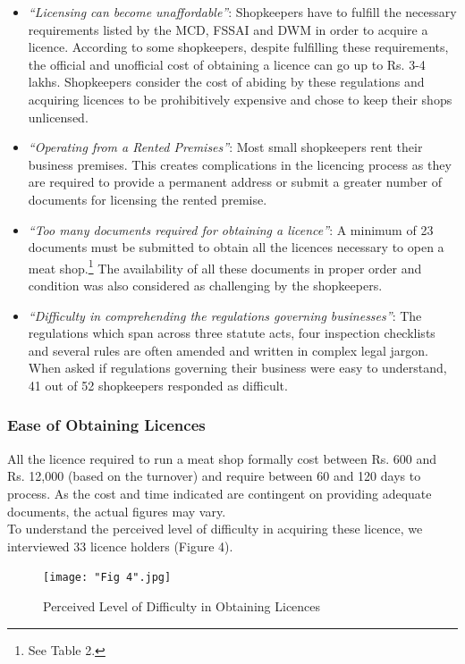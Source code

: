 \documentclass[a4paper, 12pt, twoside]{article}
\begin{document}
\begin{itemize}
\item \textit{“Licensing can become unaffordable”}: Shopkeepers have to fulfill the necessary requirements listed by the MCD, FSSAI and DWM in order to acquire a licence. According to some shopkeepers, despite fulfilling these requirements, the official and unofficial cost of obtaining a licence can go up to Rs. 3-4 lakhs. Shopkeepers consider the cost of abiding by these regulations and acquiring licences to be prohibitively expensive and chose to keep their shops unlicensed.
\item \textit{“Operating from a Rented Premises”}: Most small shopkeepers rent their business premises. This creates complications in the licencing process as they are required to provide a permanent address or submit a greater number of documents for licensing the rented premise. 
\item \textit{“Too many documents required for obtaining a licence”}: A minimum of 23 documents must be submitted to obtain all the licences necessary to open a meat shop.\footnote{ See Table 2.} The availability of all these documents in proper order and condition was also considered as challenging by the shopkeepers.
\item \textit{“Difficulty in comprehending the regulations governing businesses”}: The regulations which span across three statute acts, four inspection checklists and several rules are often amended and written in complex legal jargon. When asked if regulations governing their business were easy to understand, 41 out of 52 shopkeepers responded as difficult.
\end{itemize}

\subsubsection{Ease of Obtaining Licences}

All the licence required to run a meat shop formally cost between Rs. 600 and Rs. 12,000 (based on the turnover) and require between 60 and 120 days to process. As the cost and time indicated are contingent on providing adequate documents, the actual figures may vary. \\

To understand the perceived level of difficulty in acquiring these licence, we interviewed 33 licence holders (Figure 4).\\

\begin{figure}[H]
\centering
\texttt{[image: "Fig 4".jpg]}
\captionsetup{justification=centering}\caption[Perceived Level of Difficulty in Obtaining Licences] {Perceived Level of Difficulty in Obtaining Licences\footnotemark}
\end{figure} 
\end{document}
